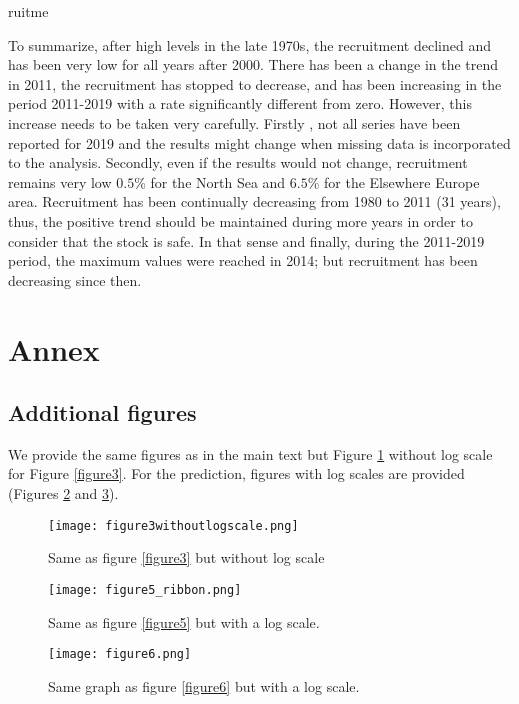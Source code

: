 ruitme\documentclass[pdftex,11pt,a4paper]{report}
\begin{document}
To summarize, after high levels in the late 1970s, the recruitment declined and has been very
low for all years after 2000. There has been a change in the trend in 2011, the
recruitment has stopped to decrease, and has been increasing in the period
2011-2019 with a rate significantly different from zero. However,  this increase needs
to be taken very carefully. Firstly , not all series have been reported for 2019
and the results might change  when missing data is incorporated to the analysis. 
Secondly, even if the results would not change, recruitment remains very low
$0.5$\% for the North Sea 
and $6.5$\% for the
Elsewhere Europe area. Recruitment has been continually decreasing
from 1980 to 2011 (31 years), thus, the positive trend should be maintained during more years in order
to consider that the stock is safe. In that sense and finally,  during the 2011-2019 period, 
the maximum values were reached in 2014; but recruitment has been decreasing
since then.


\tiny


\normalsize

\clearpage

\section*{Annex}

\subsection{Additional figures}

We provide the same figures as in the main text but Figure \ref{figure3withoutlogscale} 
without log scale for Figure \ref{figure3}. For the prediction, figures with log
scales are provided (Figures \ref{figure5_with_logscale} and
\ref{figure6_with_logscale}).

\begin{figure}[H]
\centering
\texttt{[image: figure3withoutlogscale.png]}
\caption{Same as figure \ref{figure3} but without log scale}
\label{figure3withoutlogscale}
\end{figure}
\begin{figure}[H]
\centering
\texttt{[image: figure5\_ribbon.png]}
\caption{Same as figure \ref{figure5} but with a log scale.}
\label{figure5_with_logscale}
\end{figure}
\begin{figure}[H]
\centering
\texttt{[image: figure6.png]}
\caption{Same graph as figure \ref{figure6} but with a log scale.}
\label{figure6_with_logscale}
\end{figure}
\end{document}
